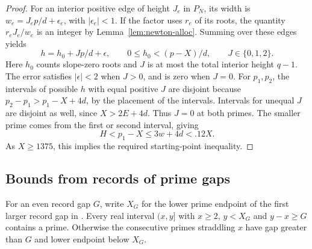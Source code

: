 \begin{proof}
For an interior positive edge of height \(J_e\) in \(P_N\), its
width is \(w_e=J_e p/d+\epsilon_e\), with
\(|\epsilon_e|<1\). If the factor uses \(r_e\) of its roots,
the quantity \(r_eJ_e/w_e\) is an integer by
Lemma~\ref{lem:newton-alloc}. Summing over these edges yields
\[
 h=h_0+Jp/d+\epsilon,\qquad
 0\le h_0<(p-X)/d,\qquad J\in\{0,1,2\}.
\]
Here \(h_0\) counts slope-zero roots and \(J\) is at most the total
interior height \(q-1\). The error satisfies \(|\epsilon|<2\) when
\(J>0\), and is zero when \(J=0\).
For \(p_1,p_2\), the intervals of possible \(h\) with equal positive
\(J\) are disjoint because \(p_2-p_1>p_1-X+4d\), by the placement of
the intervals. Intervals for unequal \(J\) are disjoint as well,
since \(X>2E+4d\). Thus \(J=0\) at both primes. The smaller prime
comes from the first or second interval, giving
\[
 H<p_1-X\le 3w+4d<.12X .
\]
As \(X\ge1375\), this implies the required starting-point inequality.
\end{proof}

\subsection{Bounds from records of prime gaps}

For an even record gap \(G\), write \(X_G\) for the lower prime
endpoint of the first larger record gap in
\cite[Table~8]{oliveira-gaps}. Every real interval \((x,y]\)
with \(x\ge2\), \(y<X_G\) and \(y-x\ge G\) contains a prime.
Otherwise the consecutive primes straddling \(x\) have gap
greater than \(G\) and lower endpoint below \(X_G\).

